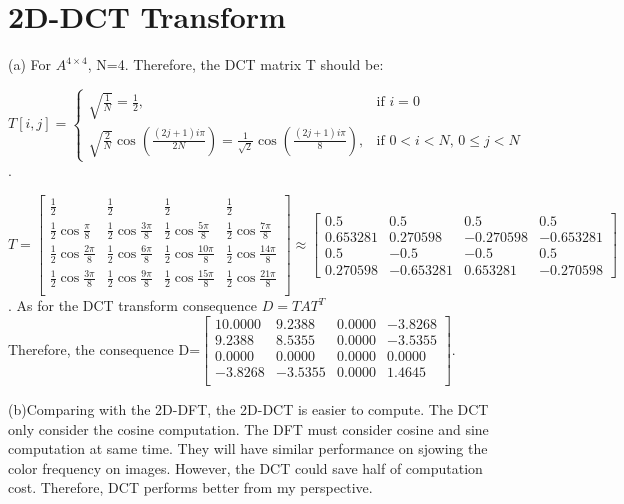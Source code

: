 \documentclass{article}
\begin{document}
\section{2D-DCT Transform}

(a) For $A^{4\times4}$, N=4. Therefore, the DCT matrix T should be:  

$ T[i,j]=
\begin{cases}
  \sqrt{\frac{1}{N}} = \frac{1}{2}, & \text{if } i=0 \\[1em]
  \sqrt{\frac{2}{N}} \cos\left(\frac{(2j+1)i\pi}{2N}\right)
= \frac{1}{\sqrt{2}} \cos\left(\frac{(2j+1)i\pi}{8}\right), & 
\text{if } 0<i<N,\, 0 \le j < N
\end{cases}
$\\. 

$
T=\begin{bmatrix}
    \frac{1}{2} & \frac{1}{2} & \frac{1}{2} & \frac{1}{2} \\
    \frac{1}{2}\cos\frac{\pi}{8} & \frac{1}{2}\cos\frac{3\pi}{8} & \frac{1}{2}\cos\frac{5\pi}{8} & \frac{1}{2}\cos\frac{7\pi}{8} \\
    \frac{1}{2}\cos\frac{2\pi}{8} & \frac{1}{2}\cos\frac{6\pi}{8} & \frac{1}{2}\cos\frac{10\pi}{8} & \frac{1}{2}\cos\frac{14\pi}{8} \\
    \frac{1}{2}\cos\frac{3\pi}{8} & \frac{1}{2}\cos\frac{9\pi}{8} & \frac{1}{2}\cos\frac{15\pi}{8} & \frac{1}{2}\cos\frac{21\pi}{8} \\
\end{bmatrix}\approx\begin{bmatrix}
    0.5 & 0.5 & 0.5 & 0.5\\
    0.653281 & 0.270598 & -0.270598 & -0.653281\\
    0.5 & -0.5 & -0.5 & 0.5\\
    0.270598 & -0.653281 & 0.653281 & -0.270598
\end{bmatrix}
$. 
As for the DCT transform consequence $D=TAT^{T}$\\
Therefore, the consequence D=$\begin{bmatrix}
10.0000 & 9.2388 & 0.0000 & -3.8268\\
9.2388 & 8.5355 & 0.0000 & -3.5355\\
0.0000 & 0.0000 & 0.0000 & 0.0000\\
-3.8268 & -3.5355 & 0.0000 & 1.4645\\
\end{bmatrix}$. 

(b)Comparing with the 2D-DFT, the 2D-DCT is easier to compute. The DCT only consider the cosine computation. The DFT must consider cosine and sine computation at same time. They will have similar performance on sjowing the color frequency on images. However, the DCT could save half of computation cost. Therefore, DCT performs better from my perspective.
\end{document}
